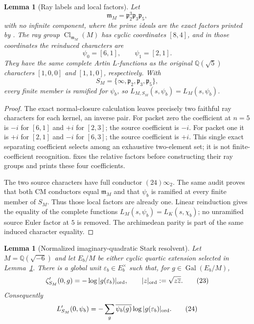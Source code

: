 \documentclass[11pt]{article}
\newtheorem{lemma}[theorem]{Lemma}
\newcommand{\Cl}{\operatorname{Cl}}
\newcommand{\Q}{\mathbb Q}
\begin{document}
\begin{lemma}[Ray labels and local factors]\label{lem:cm-label}
Let
\[
 \mathfrak m_M
 =\mathfrak p_2^3\mathfrak p_3\mathfrak p_5,
\]
with no infinite component, where the prime ideals are the exact
factors printed by
. The ray group
$\Cl_{\mathfrak m_M}(M)$ has cyclic coordinates $[8,4]$, and in those
coordinates the reinduced characters are
\[
 \psi_0=[6,1],\qquad \psi_1=[2,1].
\tag{21}
\]
They have the same complete Artin $L$-functions as the original
$\Q(\sqrt5)$ characters $[1,0,0]$ and $[1,1,0]$, respectively. With
\[
 S_M=\{\infty,\mathfrak p_2,\mathfrak p_3,\mathfrak p_5\},
\tag{22}
\]
every finite member is ramified for $\psi_b$, so
$L_{M,S_M}(s,\psi_b)=L_M(s,\psi_b)$.
\end{lemma}

\begin{proof}
The exact normal-closure calculation leaves precisely two faithful
ray characters for each kernel, an inverse pair.  For packet zero the
coefficient at $n=5$ is $-i$ for $[6,1]$ and $+i$ for $[2,3]$; the
source coefficient is $-i$.  For packet one it is $+i$ for $[2,1]$
and $-i$ for $[6,3]$; the source coefficient is $+i$.  This single
exact separating coefficient selects among an exhaustive
two-element set; it is not finite-coefficient recognition.
 fixes the relative
factors before constructing their ray groups and prints these four
coefficients.

The two source characters have full conductor $(24)\infty_2$.
The same audit proves that both CM conductors equal
$\mathfrak m_M$ and that $\psi_b$ is ramified at every
finite member of $S_M$.  Thus those local factors are already one.
Linear reinduction gives the equality of the complete functions
$L_M(s,\psi_b)=L_K(s,\chi_b)$; no unramified source Euler factor at
$5$ is removed. The archimedean parity is part of the same induced
character equality.
\end{proof}

\begin{lemma}[Normalized imaginary-quadratic Stark resolvent]
\label{lem:stark-normalization}
Let $M=\Q(\sqrt{-6})$ and let $E_b/M$ be either cyclic quartic
extension selected in Lemma~\ref{lem:cm-label}.  There is a global unit
$\varepsilon_b\in E_b^\times$ such that, for $g\in\operatorname{Gal}(E_b/M)$,
\[
 \zeta'_{S_M}(0,g)
 =-\log |g(\varepsilon_b)|_{\rm ord},
\qquad
 |z|_{\rm ord}:=\sqrt{z\overline z}.
\tag{23}
\]
Consequently
\[
 L'_{S_M}(0,\psi_b)
 =-\sum_g\overline{\psi_b(g)}
      \log|g(\varepsilon_b)|_{\rm ord}.
\tag{24}
\]
\end{lemma}
\end{document}
